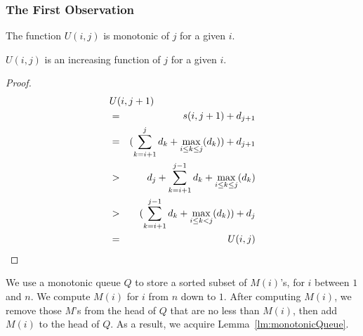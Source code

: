 \subsubsection{The First Observation}
The function $U(i, j)$ is monotonic of $j$ for a given $i$.
\begin{lemma} \label{lm:U}
$U(i, j)$ is an increasing function of $j$ for a given $i$.
\end{lemma}
\begin{proof}
\begin{eqnarray}
\lefteqn{U(i, j + 1)} \\
& = & s(i,j + 1) + d_{j+1} \\
& = & (\sum_{k = i+1}^{j} d_k + \max_{i \leq k \leq j}(d_k)) + d_{j+1} \label{eq:U-(i,dot)}\\
& > & d_j + \sum_{k = i+1}^{j-1} d_k + \max_{i \leq k \leq j}(d_k) \\
& > & (\sum_{k = i+1}^{j-1} d_k + \max_{i \leq k < j}(d_k)) + d_j\\
& = & U(i, j)
\end{eqnarray}
\end{proof}


We use a monotonic queue $Q$ to store a sorted subset of $M(i)$'s, for $i$ between $1$ and $n$.
We compute $M(i)$ for $i$ from $n$ down to $1$.
After computing $M(i)$, we remove those $M$'s from the head of $Q$ that are no less than $M(i)$, then add $M(i)$ to the head of $Q$.
As a result, we acquire Lemma~\ref{lm:monotonicQueue}.

